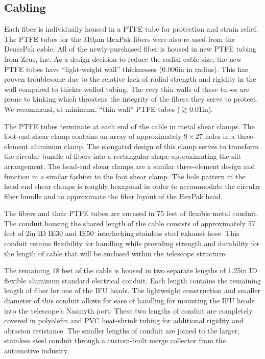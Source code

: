 \subsection{Cabling}
\label{GPBsub:sec:cabling}
Each fiber is individually housed in a PTFE tube for protection and strain
relief.  The PTFE tubes for the $310\mu$m HexPak fibers were also re-used from
the DensePak cable.  All of the newly-purchased fiber is housed in new PTFE
tubing from Zeus, Inc\footnotemark.   As a design decision to reduce
the radial cable size, the new PTFE tubes have ``light-weight wall''
thicknesses (0.006in in radius).  This has proven troublesome due to the
relative lack of radial strength and rigidity in the wall compared to
thicker-walled tubing.  The very thin walls of these tubes are prone to
kinking which threatens the integrity of the fibers they serve to protect.  We
recommend, at minimum, ``thin wall'' PTFE tubes ($\gtrsim$0.01in).


The PTFE tubes terminate at each end of the cable in metal shear clamps.  The
foot-end shear clamp contains an array of approximately $9\times27$ holes in a
three-element aluminum clamp.  The elongated design of this clamp serves to
transform the circular bundle of fibers into a rectangular shape approximating
the slit arrangement.  The head-end shear clamps are a similar three-element
design and function in a similar fashion to the foot shear clamp.  The hole
pattern in the head end shear clamps is roughly hexagonal in order to
accommodate the circular fiber bundle and to approximate the fiber layout of
the HexPak head.


The fibers and their PTFE tubes are encased in 75 feet of flexible metal
conduit.  The conduit housing the shared length of the cable consists of
approximately 57 feet of 2in ID IE30 and IE50\footnotemark\ interlocking
stainless steel exhaust hose.   This conduit retains
flexibility for handling while providing strength and durability for the
length of cable that will be enclosed within the telescope structure.


The remaining 18 feet of the cable is housed in two separate lengths of 1.25in
ID flexible aluminum standard electrical conduit.  Each length contains the
remaining length of fiber for one of the IFU heads.  The lightweight
construction and smaller diameter of this conduit allows for ease of handling
for mounting the IFU heads into the telescope's Nasmyth port.  These two
lengths of conduit are completely covered in polyolefin and PVC heat-shrink
tubing for additional rigidity and abrasion resistance.  The smaller lengths
of conduit are joined to the larger, stainless steel conduit through a
custom-built merge collector from the automotive industry\footnotemark.



